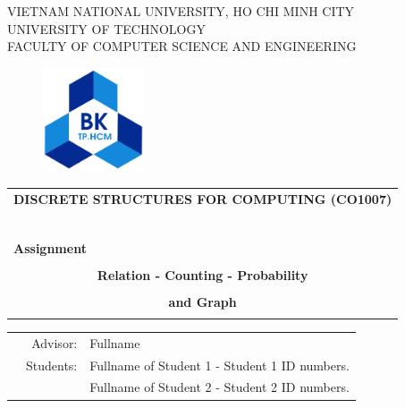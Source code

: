 \documentclass[a4paper]{article}
\begin{document}
\begin{titlepage}
  \begin{center}
    VIETNAM NATIONAL UNIVERSITY, HO CHI MINH CITY \\
    UNIVERSITY OF TECHNOLOGY \\
    FACULTY OF COMPUTER SCIENCE AND ENGINEERING
  \end{center}

  \vspace{1cm}

  \begin{figure}[h!]
    \begin{center}
      \includegraphics[width=3cm]{hcmut.png}
    \end{center}
  \end{figure}

  \vspace{1cm}


  \begin{center}
    \begin{tabular}{c}
      \multicolumn{1}{l}{\textbf{{\Large DISCRETE STRUCTURES FOR COMPUTING (CO1007)}}} \\
      ~~                                                                               \\
      \hline
      \\
      \multicolumn{1}{l}{\textbf{{\Large Assignment}}}                                 \\
      \\
      \textbf{{\Huge Relation - Counting - Probability}}                               \\
      \\
      \textbf{{\Huge and Graph}}                                                       \\
      \\
      \hline
    \end{tabular}
  \end{center}

  \vspace{3cm}

  \begin{table}[h]
    \begin{tabular}{rrl}
      \hspace{5 cm} & Advisor:  & Fullname                                      \\
                    & Students: & Fullname of Student 1 - Student 1 ID numbers. \\
                    &           & Fullname of Student 2 - Student 2 ID numbers. \\
    \end{tabular}
  \end{table}


\end{titlepage}
\end{document}
